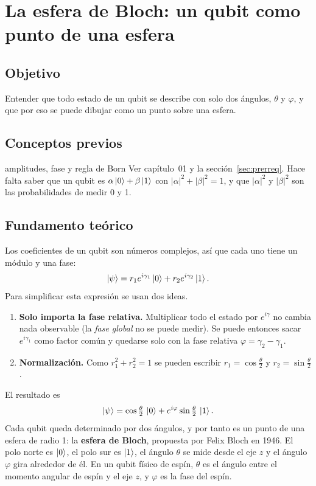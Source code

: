 \def\tituloconcepto{La esfera de Bloch}


\section{La esfera de Bloch: un qubit como punto de una esfera}

\subsection{Objetivo}
Entender que todo estado de un qubit se describe con solo dos ángulos,
$\theta$ y $\varphi$, y que por eso se puede dibujar como un punto sobre una
esfera.

\subsection{Conceptos previos}
\begin{concepto}{amplitudes, fase y regla de Born}
Ver capítulo~01 y la sección~\ref{sec:prerreq}. Hace falta saber que un qubit
es $\alpha\left|0\right\rangle+\beta\left|1\right\rangle$ con $|\alpha|^2+|\beta|^2=1$, y que $|\alpha|^2$ y
$|\beta|^2$ son las probabilidades de medir 0 y 1.
\end{concepto}

\subsection{Fundamento teórico}
Los coeficientes de un qubit son números complejos, así que cada uno tiene un
módulo y una fase:
\begin{equation}
  \left|\psi\right\rangle=r_1e^{i\gamma_1}\left|0\right\rangle+r_2e^{i\gamma_2}\left|1\right\rangle .
\end{equation}
Para simplificar esta expresión se usan dos ideas.

\begin{enumerate}
  \item \textbf{Solo importa la fase relativa.} Multiplicar todo el estado por
    $e^{i\gamma}$ no cambia nada observable (la \emph{fase global} no se puede
    medir). Se puede entonces sacar $e^{i\gamma_1}$ como factor común y
    quedarse solo con la fase relativa $\varphi=\gamma_2-\gamma_1$.
  \item \textbf{Normalización.} Como $r_1^2+r_2^2=1$ se pueden escribir
    $r_1=\cos\frac\theta2$ y $r_2=\sin\frac\theta2$.
\end{enumerate}
El resultado es
\begin{equation}
  \left|\psi\right\rangle=\cos\tfrac\theta2\,\left|0\right\rangle+e^{i\varphi}\sin\tfrac\theta2\,\left|1\right\rangle .
\end{equation}
Cada qubit queda determinado por dos ángulos, y por tanto es un punto de una
esfera de radio 1: la \textbf{esfera de Bloch}, propuesta por Felix Bloch en
1946. El polo norte es $\left|0\right\rangle$, el polo sur es $\left|1\right\rangle$, el ángulo $\theta$ se
mide desde el eje $z$ y el ángulo $\varphi$ gira alrededor de él. En un qubit
físico de espín, $\theta$ es el ángulo entre el momento angular de espín y el
eje $z$, y $\varphi$ es la fase del espín.

